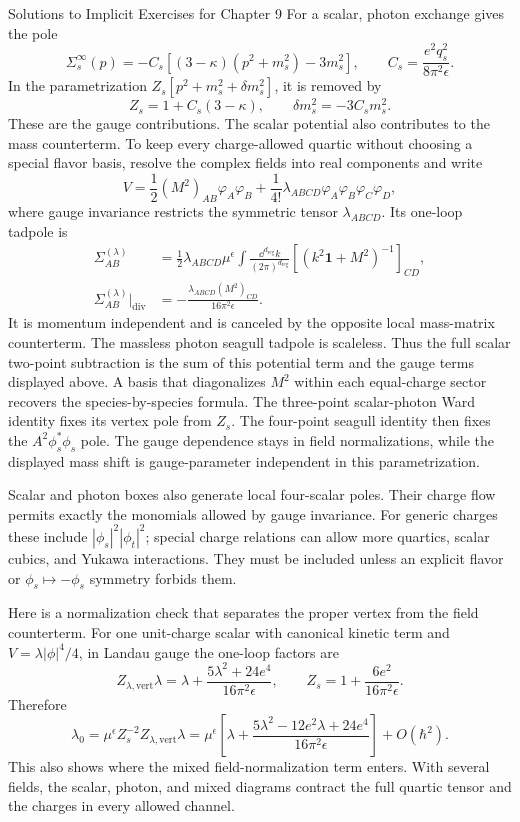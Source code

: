 \begin{bankssolutions}{Solutions to Implicit Exercises for Chapter 9}
For a scalar, photon exchange gives the pole
\[
  \Sigma_s^\infty(p)=-C_s
  \left[(3-\kappa)(p^2+m_s^2)-3m_s^2\right],
  \qquad C_s=\frac{e^2q_s^2}{8\pi^2\epsilon}.
\]
In the parametrization
$Z_s[p^2+m_s^2+\delta m_s^2]$, it is removed by
\[
  Z_s=1+C_s(3-\kappa),
  \qquad \delta m_s^2=-3C_s m_s^2.
\]
These are the gauge contributions.  The scalar potential also contributes to
the mass counterterm.  To keep every charge-allowed quartic without choosing a
special flavor basis, resolve the complex fields into real components and
write
\[
  V=\frac12(M^2)_{AB}\varphi_A\varphi_B
  +\frac1{4!}\lambda_{ABCD}\varphi_A\varphi_B\varphi_C\varphi_D,
\]
where gauge invariance restricts the symmetric tensor $\lambda_{ABCD}$.  Its
one-loop tadpole is
\[
  \begin{aligned}
    \Sigma^{(\lambda)}_{AB}
    &=\frac12\lambda_{ABCD}\mu^\epsilon
    \int\frac{\dd^{d_{\mathrm{reg}}}k}{(2\pi)^{d_{\mathrm{reg}}}}
    \left[(k^2\mathbf 1+M^2)^{-1}\right]_{CD},\\[-2pt]
    \Sigma^{(\lambda)}_{AB}\big|_{\mathrm{div}}
    &=-\frac{\lambda_{ABCD}(M^2)_{CD}}{16\pi^2\epsilon}.
  \end{aligned}
\]
It is momentum independent and is canceled by the opposite local mass-matrix
counterterm.  The massless photon seagull tadpole is scaleless.  Thus the full
scalar two-point subtraction is the sum of this potential term and the gauge
terms displayed above.  A basis that diagonalizes $M^2$ within each
equal-charge sector recovers the species-by-species formula.
The three-point scalar-photon Ward identity fixes its vertex pole from $Z_s$.
The four-point seagull identity then fixes the $A^2\phi_s^*\phi_s$ pole.  The
gauge dependence stays in field normalizations, while the displayed mass
shift is gauge-parameter independent in this parametrization.

Scalar and photon boxes also generate local four-scalar poles.  Their charge
flow permits exactly the monomials allowed by gauge invariance.  For generic
charges these include $|\phi_s|^2|\phi_t|^2$; special charge relations can
allow more quartics, scalar cubics, and Yukawa interactions.  They must be
included unless an explicit flavor or $\phi_s\mapsto-\phi_s$ symmetry forbids
them.

Here is a normalization check that separates the proper vertex from the field
counterterm.  For one unit-charge scalar with canonical kinetic term and
$V=\lambda|\phi|^4/4$, in Landau gauge the one-loop factors are
\[
  Z_{\lambda,\mathrm{vert}}\lambda
  =\lambda+\frac{5\lambda^2+24e^4}{16\pi^2\epsilon},
  \qquad
  Z_s=1+\frac{6e^2}{16\pi^2\epsilon}.
\]
Therefore
\[
  \lambda_0=\mu^\epsilon
  Z_s^{-2}Z_{\lambda,\mathrm{vert}}\lambda
  =\mu^\epsilon\left[
  \lambda+\frac{5\lambda^2-12e^2\lambda+24e^4}
  {16\pi^2\epsilon}\right]+O(\hbar^2).
\]
This also shows where the mixed field-normalization term enters.  With several
fields, the scalar, photon, and mixed diagrams contract the full quartic tensor
and the charges in every allowed channel.


\end{bankssolutions}

